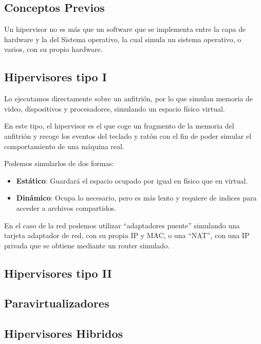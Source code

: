 \subsection{Conceptos Previos}
\noindent Un hipervisor no es más que un software que se implementa entre la capa de hardware y la del Sistema operativo, la cual simula un sistema operativo, o varios, con su propio hardware.
\subsection{Hipervisores tipo I}
\noindent Lo ejecutamos directamente sobre un anfitrión, por lo que simulan memoria de video, dispositivos y procesadores, simulando un espacio físico virtual.
\par \noindent En este tipo, el hipervisor es el que coge un fragmento de la memoria del anfitrión y recoge los eventos del teclado y ratón con el fin de poder simular el comportamiento de una máquina real.
\par \noindent Podemos simularlos de dos formas:
\begin{itemize}
        \item \textbf{Estático}: Guardará el espacio ocupado por igual en físico que en virtual.
        \item \textbf{Dinámico}: Ocupa lo necesario, pero es más lento y requiere de indices para acceder a archivos compartidos.
\end{itemize}
\noindent En el caso de la red podemos utilizar ``adaptadores puente'' simulando una tarjeta adaptador de red, con su propia IP y MAC, o una ``NAT'', con una IP privada que se obtiene mediante un router simulado.
\subsection{Hipervisores tipo II}
\subsection{Paravirtualizadores}
\subsection{Hipervisores Hibridos}